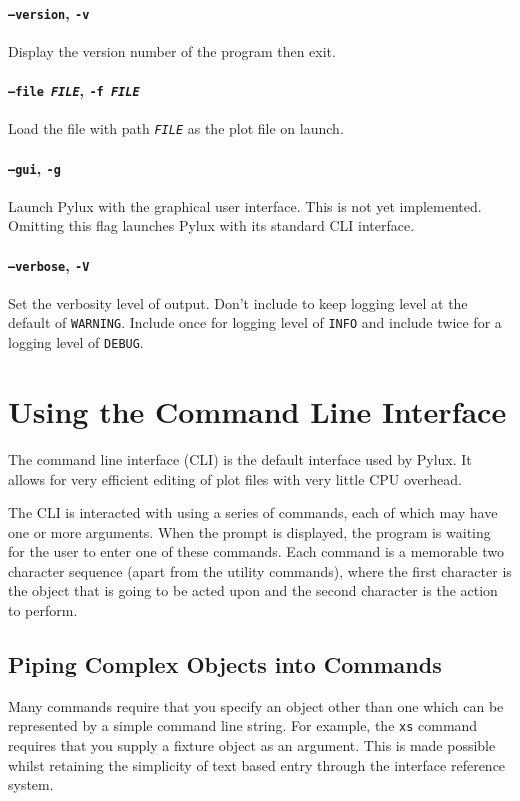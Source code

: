 \documentclass[a4paper]{article}
\begin{document}
\paragraph{\texttt{--version}, \texttt{-v}}
Display the version number of the program then exit.

\paragraph{\texttt{--file \textit{FILE}}, \texttt{-f \textit{FILE}}} 
Load the file with path \texttt{\textit{FILE}} as the plot file on launch.

\paragraph{\texttt{--gui}, \texttt{-g}}
Launch Pylux with the graphical user interface. This is not yet implemented. 
Omitting this flag launches Pylux with its standard CLI interface.

\paragraph{\texttt{--verbose}, \texttt{-V}}
Set the verbosity level of output. Don't include to keep logging level at the 
default of \texttt{WARNING}. Include once for logging level of \texttt{INFO} 
and include twice for a logging level of \texttt{DEBUG}.

\section{Using the Command Line Interface}
The command line interface (CLI) is the default interface used by Pylux. It 
allows for very efficient editing of plot files with very little CPU overhead. 

The CLI is interacted with using a series of commands, each of which may have 
one or more arguments. When the prompt is displayed, the program is waiting 
for the user to enter one of these commands. Each command is a memorable 
two character sequence (apart from the utility commands), where the first 
character is the object that is going to be acted upon and the second 
character is the action to perform.

\subsection{Piping Complex Objects into Commands}
Many commands require that you specify an object other than one which can be 
represented by a simple command line string. For example, the \texttt{xs} 
command requires that you supply a fixture object as an argument. This is made 
possible whilst retaining the simplicity of text based entry through the 
interface reference system.
\end{document}
